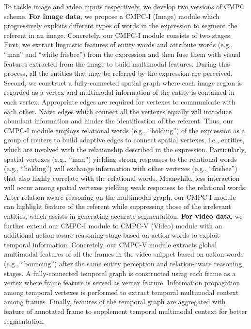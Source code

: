 \documentclass[10pt,journal,cspaper,compsoc]{IEEEtran}
\begin{document}
To tackle image and video inputs respectively, we develop two versions of CMPC scheme. 
\textbf{For image data}, we propose a CMPC-I (Image) module which progressively exploits different types of words in the expression to segment the referent in an image. 
Concretely, our CMPC-I module consists of two stages. 
First, we extract linguistic features of entity words and attribute words 
(e.g., ``man'' and ``white frisbee'') from the expression and then fuse them with visual features extracted from the image to build multimodal features. 
During this process, all the entities that may be referred by the expression are perceived. 
Second, we construct a fully-connected spatial graph where each image region is regarded as a vertex and multimodal information of the entity is contained in each vertex. 
Appropriate edges are required for vertexes to communicate with each other. 
Naive edges which connect all the vertexes equally will introduce abundant information and hinder the identification of the referent. 
Thus, our CMPC-I module employs relational words (e.g., ``holding'') of the expression as a group of routers to build adaptive edges to connect spatial vertexes, i.e., entities, which are involved with the relationship described in the expression. 
Particularly, spatial vertexes (e.g., ``man'') yielding strong responses to the relational words (e.g., ``holding'') will exchange information with other vertexes (e.g., ``frisbee'') that also highly correlate with the relational words. 
Meanwhile, less interaction will occur among spatial vertexes yielding weak responses to the relational words. 
After relation-aware reasoning on the multimodal graph, our CMPC-I module can highlight feature of the referent while suppressing those of the irrelevant entities, which assists in generating accurate segmentation.
\textbf{For video data}, we further extend our CMPC-I module to CMPC-V (Video) module with an additional action-aware reasoning stage based on action words to exploit temporal information. 
Concretely, our CMPC-V module extracts global multimodal features of all the frames in the video snippet based on action words (e.g., ``bouncing'') after the same entity perception and relation-aware reasoning stages.
A fully-connected temporal graph is constructed using each frame as a vertex where frame feature is served as vertex feature. 
Information propagation among temporal vertexes is performed to extract temporal multimodal context among frames. 
Finally, features of the temporal graph are aggregated with feature of annotated frame to supplement temporal multimodal context for better segmentation.
\end{document}
